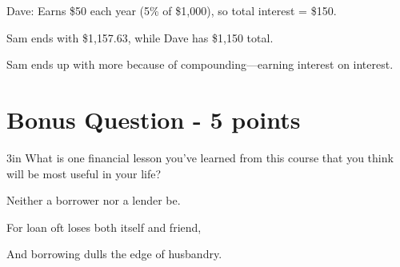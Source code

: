 \documentclass[12pt]{exam}
\begin{document}
\begin{questions}
\begin{solution}
    Dave:
    Earns \$50 each year (5\% of \$1{,}000), so total interest = \$150.

    Sam ends with \$1{,}157.63, while Dave has \$1{,}150 total.

    Sam ends up with more because of compounding—earning interest on interest.
  \end{solution}

  \section*{Bonus Question - 5 points}

  \begin{shortanswer}[5]{3in}
    What is one financial lesson you've learned from this course that you think will be most
    useful in your life?
  \end{shortanswer}
  \begin{solution}
    Neither a borrower nor a lender be.

    For loan oft loses both itself and friend,

    And borrowing dulls the edge of husbandry.
  \end{solution}

\end{questions}
\end{document}
